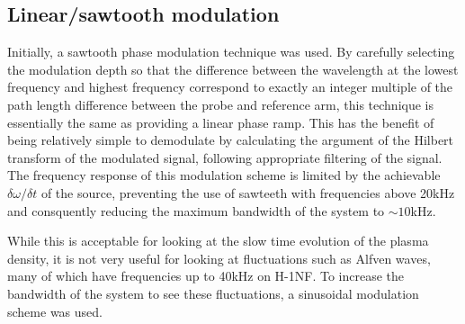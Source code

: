\thispagestyle{empty}
\subsection{Linear/sawtooth modulation}
Initially, a sawtooth phase modulation technique was used.
By carefully selecting the modulation depth so that the difference between the wavelength at the lowest frequency and highest frequency correspond to exactly an integer multiple of the path length difference between the probe and reference arm, this technique is essentially the same as providing a linear phase ramp.
This has the benefit of being relatively simple to demodulate by calculating the argument of the Hilbert transform of the modulated signal, following appropriate filtering of the signal.
The frequency response of this modulation scheme is limited by the achievable $\delta \omega / \delta t$ of the source, preventing the use of sawteeth with frequencies above 20kHz and consquently reducing the maximum bandwidth of the system to $\sim10$kHz. 

While this is acceptable for looking at the slow time evolution of the plasma density, it is not very useful for looking at fluctuations such as Alfven waves, many of which have frequencies up to 40kHz on H-1NF.
To increase the bandwidth of the system to see these fluctuations, a sinusoidal modulation scheme was used.
